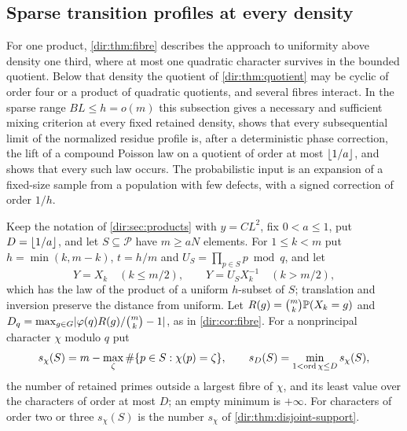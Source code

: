 \subsection{Sparse transition profiles at every density}\label{dir:sec:profiles}

For one product, \cref{dir:thm:fibre} describes the approach to uniformity above density one third,
where at most one quadratic character survives in the bounded quotient. Below that density the quotient
of \cref{dir:thm:quotient} may be cyclic of order four or a product of quadratic quotients, and several
fibres interact. In the sparse range $BL\le h=o(m)$ this subsection gives a necessary and sufficient
mixing criterion at every fixed retained density, shows that every subsequential limit of the normalized
residue profile is, after a deterministic phase correction, the lift of a compound Poisson law on a
quotient of order at most $\lfloor1/a\rfloor$, and shows that every such law occurs. The probabilistic input is
an expansion of a fixed-size sample from a population with few defects, with a signed correction of
order $1/h$.

Keep the notation of \cref{dir:sec:products} with $y=CL^2$, fix $0<a\le1$, put $D=\lfloor1/a\rfloor$, and let
$S\subseteq\mathcal P$ have $m\ge aN$ elements. For $1\le k<m$ put $h=\min(k,m-k)$, $t=h/m$ and
$U_S=\prod_{p\in S}p\bmod q$, and let
\[
 Y=X_k\quad(k\le m/2),\qquad Y=U_SX_k^{-1}\quad(k>m/2),
\]
which has the law of the product of a uniform $h$-subset of $S$; translation and inversion preserve the
distance from uniform. Let $R(g)=\binom mk\mathbb{P}(X_k=g)$ and
$D_q=\max_{g\in G}\lvert\varphi(q)R(g)/\binom mk-1\rvert$, as in \cref{dir:cor:fibre}. For a nonprincipal
character $\chi$ modulo $q$ put
\[
 s_\chi(S)=m-\max_\zeta\#\{p\in S:\chi(p)=\zeta\},\qquad s_D(S)=\min_{1<\operatorname{ord}\chi\le D}s_\chi(S),
\]
the number of retained primes outside a largest fibre of $\chi$, and its least value over the
characters of order at most $D$; an empty minimum is $+\infty$. For characters of order two or three
$s_\chi(S)$ is the number $s_\chi$ of \cref{dir:thm:disjoint-support}.

